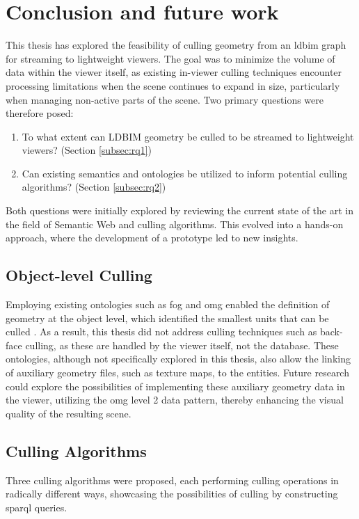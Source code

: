 \chapter{Conclusion and future work} \label{ch:conclusion}
This thesis has explored the feasibility of culling geometry from an \ac{ldbim} graph for streaming to lightweight viewers. The goal was to minimize the volume of data within the viewer itself, as existing in-viewer culling techniques encounter processing limitations when the scene continues to expand in size, particularly when managing non-active parts of the scene. Two primary questions were therefore posed:

\begin{enumerate}
    \item To what extent can LDBIM geometry be culled to be streamed to lightweight viewers? (Section \ref{subsec:rq1})
    \item Can existing semantics and ontologies be utilized to inform potential culling algorithms? (Section \ref{subsec:rq2})
\end{enumerate}

Both questions were initially explored by reviewing the current state of the art in the field of Semantic Web and culling algorithms. This evolved into a hands-on approach, where the development of a prototype led to new insights.

\section{Object-level Culling}
Employing existing ontologies such as \ac{fog} and \ac{omg} enabled the definition of geometry at the object level, which identified the smallest units that can be culled . As a result, this thesis did not address culling techniques such as back-face culling, as these are handled by the viewer itself, not the database. These ontologies, although not specifically explored in this thesis, also allow the linking of auxiliary geometry files, such as texture maps, to the entities. Future research could explore the possibilities of implementing these auxiliary geometry data in the viewer, utilizing the \ac{omg} level 2 data pattern, thereby enhancing the visual quality of the resulting scene.

\section{Culling Algorithms}
Three culling algorithms were proposed, each performing culling operations in radically different ways, showcasing the possibilities of culling by constructing \ac{sparql} queries.

